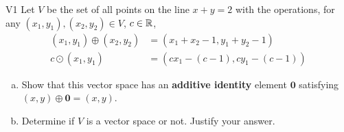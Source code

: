 \documentclass{sbgLAsemi}
\begin{document}
\begin{problem}{V1}
Let $V$ be the set of all points on the line $x+y=2$ with the operations, for any $(x_1,y_1), (x_2,y_2) \in V$, $c \in \mathbb{R}$,
\begin{align*}
(x_1,y_1) \oplus (x_2,y_2) &= (x_1+x_2-1,y_1+y_2-1) \\
c \odot (x_1,y_1) &= (cx_1-(c-1), cy_1-(c-1))
\end{align*}
\begin{enumerate}[(a)]
\item Show that this vector space has an \textbf{additive identity} element
      \(\mathbf{0}\) satisfying \((x,y)\oplus\mathbf{0}=(x,y)\).
\item Determine if $V$ is a vector space or not.  Justify your answer.
\end{enumerate}
\end{problem}
\end{document}
